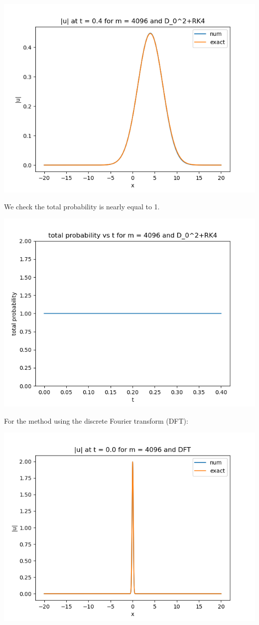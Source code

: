 \documentclass{article}
\begin{document}
\begin{enumerate}[label=(\alph*)]
\begin{center}
	\includegraphics[scale=.3]{FINAL u_abs t = 0.4 m = 4096 D02+RK4}
\end{center}
We check the total probability is nearly equal to 1.
\begin{center}
	\includegraphics[scale=.5]{FINAL prob m = 4096 D02+RK4}
\end{center}
For the method using the discrete Fourier transform (DFT):
\begin{center}
	\includegraphics[scale=.3]{FINAL u_abs t = 0.0 m = 4096 DFT}

\end{center}
\end{enumerate}
\end{document}
